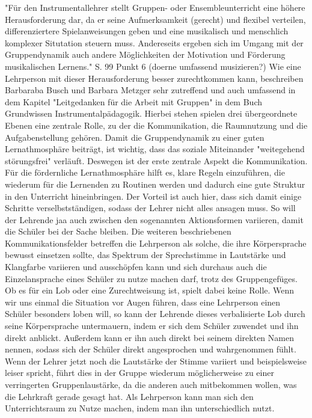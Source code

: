 "Für den Instrumentallehrer stellt Gruppen- oder Ensembleunterricht eine höhere
Herausforderung dar, da er seine Aufmerksamkeit (gerecht) und flexibel
verteilen, differenziertere Spielanweisungen geben und eine musikalisch und
menschlich komplexer Situtation steuern muss. Andereseits ergeben sich im Umgang
mit der Gruppendynamik auch andere Möglichkeiten der Motivation und Förderung
musikalischen Lernens." S. 99 Punkt 6 (doerne umfassend musizieren?) Wie eine
Lehrperson mit dieser Herausforderung besser zurechtkommen kann, beschreiben
Barbaraba Busch und Barbara Metzger sehr zutreffend und auch umfassend in dem
Kapitel "Leitgedanken für die Arbeit mit Gruppen" in dem Buch Grundwissen
Instrumentalpädagogik. Hierbei stehen spielen drei übergeordnete Ebenen eine
zentrale Rolle, zu der die Kommunikation, die Raumnutzung und die
Aufgabenstellung gehören. Damit die Gruppendynamik zu einer guten
Lernathmosphäre beiträgt, ist wichtig, dass das soziale Miteinander "weitegehend
störungsfrei" verläuft. Deswegen ist der erste zentrale Aspekt die
Kommunikation. Für die fördernliche Lernathmosphäre hilft es, klare Regeln
einzuführen, die wiederum für die Lernenden zu Routinen werden und dadurch eine
gute Struktur in den Unterricht hineinbringen. Der Vorteil ist auch hier, dass
sich damit einige Schritte verselbstständigen, sodass der Lehrer nicht alles
ansagen muss. So will der Lehrende jaa auch zwischen den sogenannten
Aktionsformen variieren, damit die Schüler bei der Sache bleiben. Die weiteren
beschriebenen Kommunikationsfelder betreffen die Lehrperson als solche, die ihre
Körpersprache bewusst einsetzen sollte, das Spektrum der Sprechstimme in
Lautstärke und Klangfarbe variieren und ausschöpfen kann und sich durchaus auch
die Einzelansprache eines Schüler zu nutze machen darf, trotz des
Gruppengefüges. Ob es für ein Lob oder eine Zurechtweisung ist, spielt dabei
keine Rolle. Wenn wir uns einmal die Situation vor Augen führen, dass eine
Lehrperson einen Schüler besonders loben will, so kann der Lehrende dieses
verbalisierte Lob durch seine Körpersprache untermauern, indem er sich dem
Schüler zuwendet und ihn direkt anblickt. Außerdem kann er ihn auch direkt bei
seinem direkten Namen nennen, sodass sich der Schüler direkt angesprochen und
wahrgenommen fühlt. Wenn der Lehrer jetzt noch die Lautstärke der Stimme
variiert und beispielsweise leiser spricht, führt dies in der Gruppe wiederum
möglicherweise zu einer verringerten Gruppenlaustärke, da die anderen auch
mitbekommen wollen, was die Lehrkraft gerade gesagt hat. Als Lehrperson kann man
sich den Unterrichtsraum zu Nutze machen, indem man ihn unterschiedlich nutzt.
